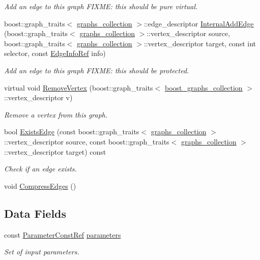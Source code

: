 \begin{DoxyCompactItemize}
\begin{DoxyCompactList}\small\item\em Add an edge to this graph F\+I\+X\+ME\+: this should be pure virtual. \end{DoxyCompactList}\item 
boost\+::graph\+\_\+traits$<$ \hyperlink{structgraphs__collection}{graphs\+\_\+collection} $>$\+::edge\+\_\+descriptor \hyperlink{structgraphs__collection_a93b6975b6ecad6fa56ff112eaeb39270}{Internal\+Add\+Edge} (boost\+::graph\+\_\+traits$<$ \hyperlink{structgraphs__collection}{graphs\+\_\+collection} $>$\+::vertex\+\_\+descriptor source, boost\+::graph\+\_\+traits$<$ \hyperlink{structgraphs__collection}{graphs\+\_\+collection} $>$\+::vertex\+\_\+descriptor target, const int selector, const \hyperlink{edge__info_8hpp_a65ddc964b1738667fc720f0de33aeef9}{Edge\+Info\+Ref} info)
\begin{DoxyCompactList}\small\item\em Add an edge to this graph F\+I\+X\+ME\+: this should be protected. \end{DoxyCompactList}\item 
virtual void \hyperlink{structgraphs__collection_abf3690c3dab1f860b7b0a520b59d0e01}{Remove\+Vertex} (boost\+::graph\+\_\+traits$<$ \hyperlink{graph_8hpp_a315f0e4c95fedf30b91945ed29d42332}{boost\+\_\+graphs\+\_\+collection} $>$\+::vertex\+\_\+descriptor v)
\begin{DoxyCompactList}\small\item\em Remove a vertex from this graph. \end{DoxyCompactList}\item 
bool \hyperlink{structgraphs__collection_abd66e72ce6935149b74c2a4572e9b337}{Exists\+Edge} (const boost\+::graph\+\_\+traits$<$ \hyperlink{structgraphs__collection}{graphs\+\_\+collection} $>$\+::vertex\+\_\+descriptor source, const boost\+::graph\+\_\+traits$<$ \hyperlink{structgraphs__collection}{graphs\+\_\+collection} $>$\+::vertex\+\_\+descriptor target) const
\begin{DoxyCompactList}\small\item\em Check if an edge exists. \end{DoxyCompactList}\item 
void \hyperlink{structgraphs__collection_a12d20bedcccbecf2d7af587f377d5a63}{Compress\+Edges} ()
\end{DoxyCompactItemize}
\subsection*{Data Fields}
\begin{DoxyCompactItemize}
\item 
const \hyperlink{Parameter_8hpp_a37841774a6fcb479b597fdf8955eb4ea}{Parameter\+Const\+Ref} \hyperlink{structgraphs__collection_adfc2ecaf0a04245a3cfd572c213ef1ed}{parameters}
\begin{DoxyCompactList}\small\item\em Set of input parameters. \end{DoxyCompactList}\end{DoxyCompactItemize}



